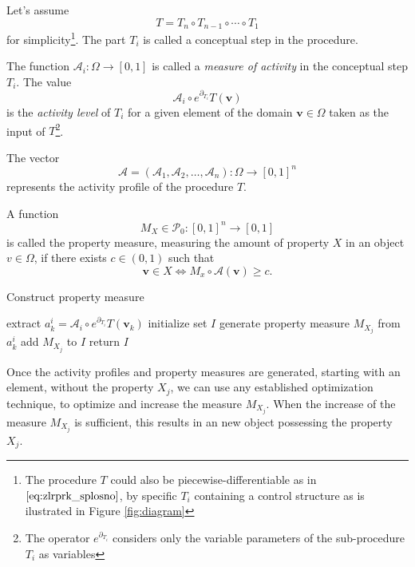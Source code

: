 \documentclass[11pt]{article}
\newcommand{\vv}{\mathbf{v}}
\newcommand{\dP}{\mathcal{P}}
\newcommand{\D}{\partial}
\begin{document}
   Let's assume 
   $$T=T_n\circ T_{n-1}\circ\cdots\circ T_1$$
   for simplicity\footnote{The procedure $T$ could also be piecewise-differentiable as in
     $\eqref{eq:zlrprk_splosno}$, by specific $T_i$ containing a control
     structure as is ilustrated in Figure \ref{fig:diagram}}. The part $T_i$ is called a conceptual step in the procedure.
  
   
   \begin{definition}
   The function $\mathcal{A}_i:\Omega\to[0,1]$ is called a \emph{measure of
     activity} in the conceptual step $T_i$. The value  
   $$\mathcal{A}_i\circ e^{\D_{T_i}}T(\vv)$$ 
   is the \emph{activity level} of $T_i$ for a given element of the domain
   $\vv\in \Omega$ taken as the input of $T$\footnote{The operator $e^{\D_{T_i}}$
     considers only the variable parameters of the sub-procedure $T_i$ as
     variables}.
   
   The vector $$\mathcal{A}=(\mathcal{A}_1,\mathcal{A}_2,\dots,\mathcal{A}_n):\Omega\to[0,1]^n$$ represents the activity profile of the procedure $T$. 
   \end{definition}
   
   
   \begin{definition}
    A function 
    $$M_X\in\dP_0:[0,1]^n\to[0,1]$$  
    is called the property measure, measuring the amount of property $X$ in an object $v\in\Omega$, if there exists  $c\in(0,1)$ such that 
    $$\vv\in X\iff M_x\circ\mathcal{A}(\vv)\ge c.$$
    \end{definition}
   \vspace{-1cm}
   \begin{algorithm}[H]

     
   \caption{Construct property measure}
   \label{alg:propertyMeasure}
   \begin{algorithmic}[1]
   \For{each $\vv_k\in \Omega$}
   \State extract $a^i_k=\mathcal{A}_i\circ e^{\D_{T_i}}T(\vv_k)$
	\EndFor
	\EndFor
	\State initialize set $I$
   \State generate property measure $M_{X_j}$ from $a^i_k$
   \State add $M_{X_j}$ to $I$
   \EndFor
   \State return $I$
   \EndProcedure
   \end{algorithmic}
   \end{algorithm}
   
   Once the activity profiles and property measures are generated, starting with an element, without the property $X_j$, we can use any established optimization technique, to optimize and increase the measure $M_{X_j}$. When the increase of the measure $M_{X_j}$ is sufficient, this results in an new object possessing the property $X_j$.
   
\end{document}
